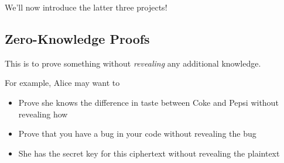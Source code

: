 We'll now introduce the latter three projects!

\subsection{Zero-Knowledge Proofs}
This is to prove something without \emph{revealing} any additional knowledge.

For example, Alice may want to
\begin{itemize}
    \item Prove she knows the difference in taste between Coke and Pepsi without revealing how
    \item Prove that you have a bug in your code without revealing the bug
    \item She has the secret key for this ciphertext without revealing the plaintext
\end{itemize}

